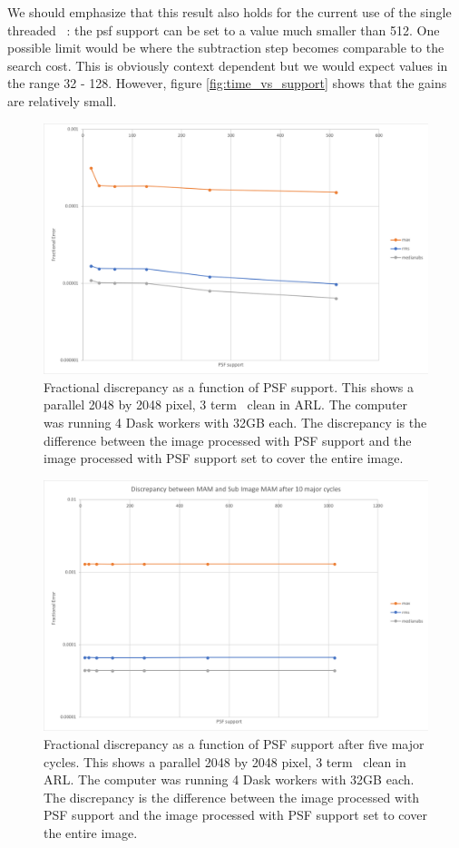 \documentclass[11pt,a4paper,variablewidth]{article}
\begin{document}
We should emphasize that this result also holds for the current use of the single threaded \MAM\ : the psf support can be set to a value much smaller than 512. One possible limit would be where the subtraction step becomes comparable to the search cost. This is obviously context dependent but we would expect values in the range 32 - 128. However, figure \ref{fig:time_vs_support} shows that the gains are relatively small.

\begin{figure}[H]
  \centering
  \includegraphics[width=\textwidth]{./pngs/error_versus_support.png}
  \caption{Fractional discrepancy as a function of PSF support. This shows a parallel 2048 by 2048 pixel, 3 term \MAM\ clean in ARL. The computer was running 4 Dask workers with 32GB each. The discrepancy is the difference between the image processed with PSF support and the image processed with PSF support set to cover the entire image.}
  \label{fig:error_vs_support}
\end{figure}

\begin{figure}[H]
  \centering
  \includegraphics[width=\textwidth]{./pngs/error_versus_support_ci.png}
  \caption{Fractional discrepancy as a function of PSF support after five major cycles. This shows a parallel 2048 by 2048 pixel, 3 term \MAM\ clean in ARL. The computer was running 4 Dask workers with 32GB each. The discrepancy is the difference between the image processed with PSF support and the image processed with PSF support set to cover the entire image.}
  \label{fig:error_vs_support_ci}
\end{figure}
\end{document}
